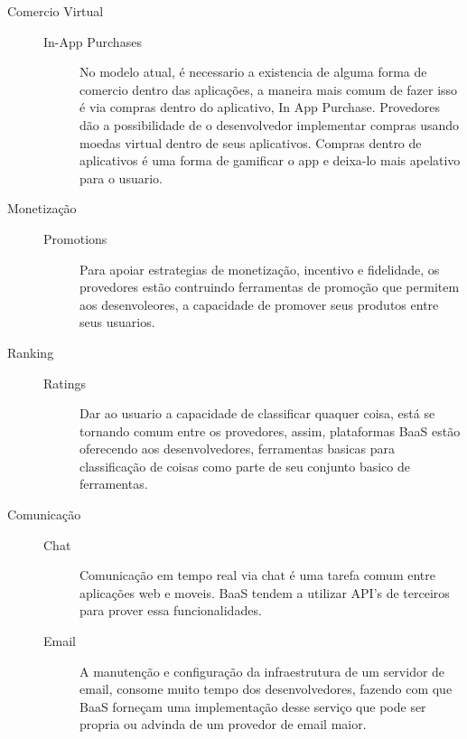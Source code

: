 \begin{description}
		\item[Comercio Virtual]
			\begin{description}
            	\item[]
				\item[In-App Purchases] { No modelo atual, é necessario a existencia de alguma forma de comercio dentro das aplicações, a maneira mais comum de fazer isso é via compras dentro do aplicativo, In App Purchase. Provedores dão a possibilidade de o desenvolvedor implementar compras usando moedas virtual dentro de seus aplicativos. Compras dentro de aplicativos é uma forma de gamificar o app e deixa-lo mais apelativo para o usuario.}
			\end{description}
		
		\item[Monetização]
			\begin{description}
            	\item[]
				\item[Promotions] { Para apoiar estrategias de monetização, incentivo e fidelidade, os provedores estão contruindo ferramentas de promoção que permitem aos desenvoleores, a capacidade de promover seus produtos entre seus usuarios.}
			\end{description}
		
		\item[Ranking]
			\begin{description}
            	\item[]
				\item[Ratings] { Dar ao usuario a capacidade de classificar quaquer coisa, está se tornando comum entre os provedores, assim, plataformas BaaS estão oferecendo aos desenvolvedores, ferramentas basicas para classificação de coisas como parte de seu conjunto basico de ferramentas.}
			\end{description}
		
		\item[Comunicação]
			\begin{description}
				\item[]
                \item[Chat] { Comunicação em tempo real via chat é uma tarefa comum entre aplicações web e moveis. BaaS tendem a utilizar API's de terceiros para prover essa funcionalidades.}

				\item[Email] { A manutenção e configuração da infraestrutura de um servidor de email, consome muito tempo dos desenvolvedores, fazendo com que BaaS forneçam uma implementação desse serviço que pode ser propria ou advinda de um provedor de email maior.}


\end{description}
\end{description}
